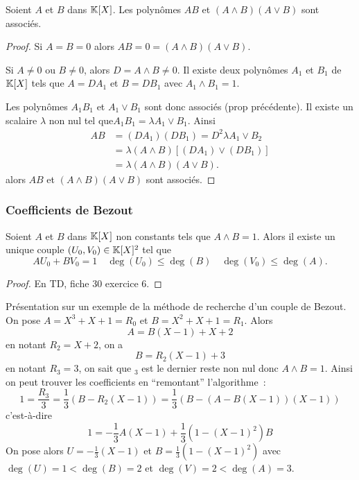   \begin{prop}
    Soient \(A\) et \(B\) dans \(\mathbb{K}[X]\). Les polynômes \(AB\) et \((A\wedge B)(A \vee B)\) sont associés.
  \end{prop}
  \begin{proof}
    Si \(A=B=0\) alors \(AB=0=(A\wedge B)(A \vee B)\).

    Si \(A\neq 0\) ou \(B\neq 0\), alors \(D=A \wedge B \neq 0\). Il existe deux polynômes \(A_1\) et \(B_1\) de \(\mathbb{K}[X]\) tels que \(A=DA_1\) et \(B=DB_1\) avec \(A_1 \wedge B_1 =1\).

    Les polynômes \(A_1B_1\) et \(A_1 \vee B_1\) sont donc associés (prop précédente). Il existe un scalaire \(\lambda\) non nul tel que\( A_1B_1= \lambda A_1 \vee B_1\). Ainsi
    \begin{align}
      AB&=(DA_1)(DB_1) = D^2 \lambda A_1 \vee B_2 \\
        &=\lambda (A \wedge B) [(DA_1) \vee (DB_1)]\\
        &=\lambda (A \wedge B)(A \vee B).
    \end{align}
    alors \(AB\) et \((A\wedge B)(A \vee B)\) sont associés.
  \end{proof}

  \subsubsection{Coefficients de Bezout}

  \begin{prop}
    Soient \(A\) et \(B\) dans \(\mathbb{K}[X]\) non constants tels que \(A\wedge B=1\). Alors il existe un unique couple \((U_0,V_0) \in \mathbb{K}[X]^2\) tel que
    \begin{equation}
      AU_0+BV_0 = 1 \quad \deg(U_0) \leqslant \deg(B) \quad \deg(V_0) \leqslant \deg(A).
    \end{equation}
  \end{prop}
  \begin{proof}
    En TD, fiche 30 exercice 6.
  \end{proof}

  Présentation sur un exemple de la méthode de recherche d'un couple de Bezout. On pose \(A=X^3+X+1=R_0\) et \(B=X^2+X+1=R_1\). Alors
  \begin{equation}
    A=B(X-1)+X+2
  \end{equation}
  en notant \(R_2=X+2\), on a
  \begin{equation}
    B=R_2(X-1)+3
  \end{equation}
  en notant \(R_3=3\), on sait que \(_3\) est le dernier reste non nul donc \(A\wedge B=1\). Ainsi on peut trouver les coefficients en ``remontant'' l'algorithme~:
  \begin{equation}
    1 = \frac{R_3}{3} = \frac{1}{3}(B-R_2(X-1)) = \frac{1}{3}(B-(A-B(X-1))(X-1))
  \end{equation}
  c'est-à-dire
  \begin{equation}
    1 = -\frac{1}{3} A(X-1) + \frac{1}{3}(1-(X-1)^2)B
  \end{equation}
  On pose alors \(U=-\frac{1}{3}(X-1)\) et \(B=\frac{1}{3}(1-(X-1)^2)\) avec \(\deg(U)=1 < \deg(B)=2\) et \(\deg(V)=2 < \deg(A)=3\).


